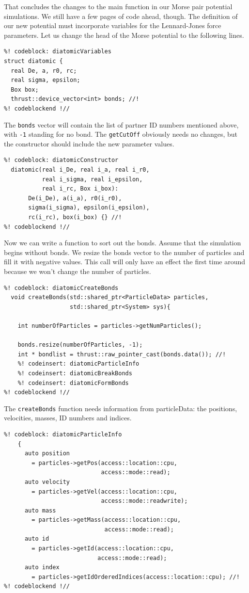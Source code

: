 That concludes the changes to the main function in our Morse pair potential 
simulations. We still have a few pages of code ahead, though. The definition of 
our new potential must incorporate variables for the Lennard-Jones force 
parameters. Let us change the head of the Morse potential to the following 
lines.
\begin{lstlisting}
%! codeblock: diatomicVariables
struct diatomic {
  real De, a, r0, rc;
  real sigma, epsilon;
  Box box;
  thrust::device_vector<int> bonds; //!
%! codeblockend !//
\end{lstlisting}
The \texttt{bonds} vector will contain the list of partner ID numbers mentioned 
above, with \texttt{-1} standing for no bond. The \texttt{getCutOff} obviously 
needs no changes, but the constructor should include the new parameter values.
\begin{lstlisting}
%! codeblock: diatomicConstructor
  diatomic(real i_De, real i_a, real i_r0,
           real i_sigma, real i_epsilon,
           real i_rc, Box i_box):
       De(i_De), a(i_a), r0(i_r0),
       sigma(i_sigma), epsilon(i_epsilon),
       rc(i_rc), box(i_box) {} //!
%! codeblockend !//
\end{lstlisting}
Now we can write a function to sort out the bonds. Assume that the simulation 
begins without bonds. We resize the bonds vector to the number of particles and 
fill it with negative values. This call will only have an effect the first time 
around because we won't change the number of particles.
\begin{lstlisting}
%! codeblock: diatomicCreateBonds
  void createBonds(std::shared_ptr<ParticleData> particles,
                   std::shared_ptr<System> sys){

    int numberOfParticles = particles->getNumParticles();

    bonds.resize(numberOfParticles, -1);
    int * bondlist = thrust::raw_pointer_cast(bonds.data()); //!
    %! codeinsert: diatomicParticleInfo
    %! codeinsert: diatomicBreakBonds
    %! codeinsert: diatomicFormBonds
%! codeblockend !//
\end{lstlisting}
The \texttt{createBonds} function needs information from particleData: the
positions, velocities, masses, ID numbers and indices.
\begin{lstlisting}
%! codeblock: diatomicParticleInfo
  	{
      auto position
        = particles->getPos(access::location::cpu,
                            access::mode::read);
      auto velocity
        = particles->getVel(access::location::cpu,
                            access::mode::readwrite);
      auto mass
        = particles->getMass(access::location::cpu,
                             access::mode::read);
      auto id
        = particles->getId(access::location::cpu,
                           access::mode::read);
      auto index
        = particles->getIdOrderedIndices(access::location::cpu); //!
%! codeblockend !//
\end{lstlisting}
